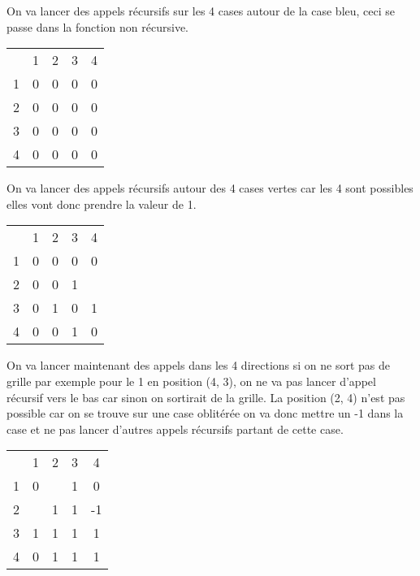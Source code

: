 On va lancer des appels récursifs sur les 4 cases autour de la case bleu, ceci se passe dans la fonction non récursive.\\
\begin{center}
\begin{tabular}{c|c|c|c|c|}
\multicolumn{1}{c}{} & \multicolumn{1}{c}{1} & \multicolumn{1}{c}{2} & \multicolumn{1}{c}{3} & \multicolumn{1}{c}{4}\\
\cline{2-5} 1 & 0 & \cellcolor{red}0 & 0 & 0\\
\cline{2-5} 2 & \cellcolor{red}0 & 0 & \cellcolor{green}0 & \cellcolor{red}0\\
\cline{2-5} 3 & 0 & \cellcolor{green}0 & 0 & \cellcolor{green}0\\
\cline{2-5} 4 & 0 & 0 & \cellcolor{green}0 & 0\\
\cline{2-5}
\end{tabular}
\end{center}
On va lancer des appels récursifs autour des 4 cases vertes car les 4 sont possibles elles vont donc prendre la valeur de 1.\\
\begin{center}
\begin{tabular}{c|c|c|c|c|}
\multicolumn{1}{c}{} & \multicolumn{1}{c}{1} & \multicolumn{1}{c}{2} & \multicolumn{1}{c}{3} & \multicolumn{1}{c}{4}\\
\cline{2-5} 1 & 0 & \cellcolor{red}0 & \cellcolor{green}0 & 0\\
\cline{2-5} 2 & \cellcolor{red}0 & \cellcolor{green}0 & 1 & \cellcolor{red}\color{blue}{0}\\
\cline{2-5} 3 & \cellcolor{green}0 & 1 & \cellcolor{green}0 & 1\\
\cline{2-5} 4 & 0 & \cellcolor{green}0 & 1 & \cellcolor{green}0\\
\cline{2-5}
\end{tabular}
\end{center}
On va lancer maintenant des appels dans les 4 directions si on ne sort pas de grille par exemple pour le 1 en position (4, 3), on ne va pas lancer d'appel récursif vers le bas car sinon on sortirait de la grille. La position (2, 4) n'est pas possible car on se trouve sur une case oblitérée on va donc mettre un -1 dans la case et ne pas lancer d'autres appels récursifs partant de cette case.\\ 
\begin{center}
\begin{tabular}{c|c|c|c|c|}
\multicolumn{1}{c}{} & \multicolumn{1}{c}{1} & \multicolumn{1}{c}{2} & \multicolumn{1}{c}{3} & \multicolumn{1}{c}{4}\\
\cline{2-5} 1 & 0 & \cellcolor{red}\color{blue}{0} & 1 & \cellcolor{green}0\\
\cline{2-5} 2 & \cellcolor{red}\color{blue}{0} & 1 & 1 & \cellcolor{red}-1\\
\cline{2-5} 3 & 1 & 1 & 1 & 1\\
\cline{2-5} 4 & \cellcolor{green}0 & 1 & 1 & 1\\
\cline{2-5}
\end{tabular}
\end{center}
